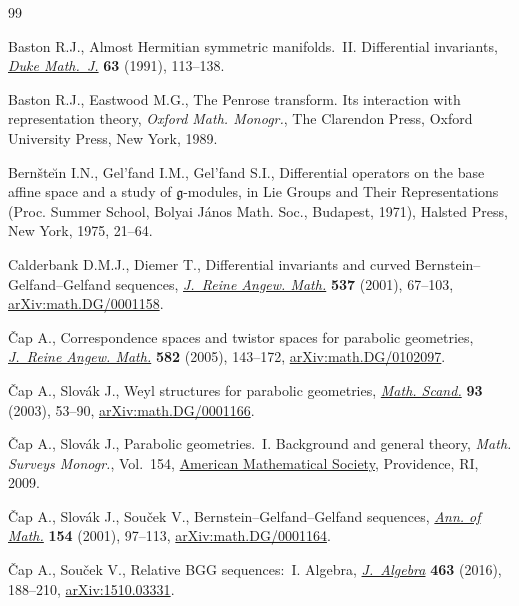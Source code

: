 \begin{thebibliography}{99}
\footnotesize\itemsep=0pt

Baston R.J., Almost {H}ermitian symmetric manifolds.~{II}. {D}ifferential
 invariants, \href{https://doi.org/10.1215/S0012-7094-91-06306-4}{\textit{Duke Math.~J.}} \textbf{63} (1991), 113--138.

Baston R.J., Eastwood M.G., The {P}enrose transform. Its interaction with
 representation theory, \textit{Oxford Math. Monogr.}, The Clarendon Press, Oxford
 University Press, New York, 1989.

Bern\v{s}te\u{\i}n I.N., Gel'fand I.M., Gel'fand S.I., Differential operators
 on the base affine space and a study of {$\mathfrak{g}$}-modules, in Lie
 Groups and Their Representations ({P}roc. {S}ummer {S}chool, {B}olyai
 {J}\'anos {M}ath. {S}oc., {B}udapest, 1971), Halsted Press, New York, 1975,
 21--64.

Calderbank D.M.J., Diemer T., Differential invariants and curved
 {B}ernstein--{G}elfand--{G}elfand sequences, \href{https://doi.org/10.1515/crll.2001.059}{\textit{J.~Reine Angew. Math.}}
 \textbf{537} (2001), 67--103, \href{https://arxiv.org/abs/math.DG/0001158}{arXiv:math.DG/0001158}.

{\v{C}}ap A., Correspondence spaces and twistor spaces for parabolic
 geometries, \href{https://doi.org/10.1515/crll.2005.2005.582.143}{\textit{J.~Reine Angew. Math.}} \textbf{582} (2005), 143--172,
 \href{https://arxiv.org/abs/math.DG/0102097}{arXiv:math.DG/0102097}.

{\v{C}}ap A., Slov\'ak J., Weyl structures for parabolic geometries,
 \href{https://doi.org/10.7146/math.scand.a-14413}{\textit{Math. Scand.}} \textbf{93} (2003), 53--90, \href{https://arxiv.org/abs/math.DG/0001166}{arXiv:math.DG/0001166}.

{\v{C}}ap A., Slov\'ak J., Parabolic geometries.~{I}. Background and general
 theory, \textit{Math. Surveys Monogr.}, Vol.~154, \href{https://doi.org/10.1090/surv/154}{American Mathematical
 Society}, Providence, RI, 2009.

{\v{C}}ap A., Slov\'ak J., Sou\v{c}ek V., Bernstein--{G}elfand--{G}elfand
 sequences, \href{https://doi.org/10.2307/3062111}{\textit{Ann. of Math.}} \textbf{154} (2001), 97--113,
 \href{https://arxiv.org/abs/math.DG/0001164}{arXiv:math.DG/0001164}.

{\v{C}}ap A., Sou\v{c}ek V., Relative {BGG} sequences:~{I}. {A}lgebra,
 \href{https://doi.org/10.1016/j.jalgebra.2016.06.007}{\textit{J.~Algebra}} \textbf{463} (2016), 188--210, \href{https://arxiv.org/abs/1510.03331}{arXiv:1510.03331}.


\end{thebibliography}
